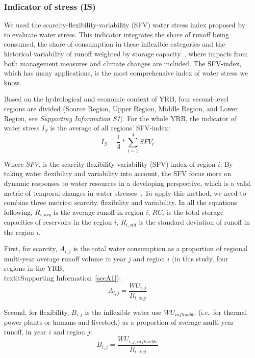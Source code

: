 	\subsubsection{Indicator of stress (IS)}
	We used the scarcity-flexibility-variability (SFV) water stress index proposed by  to evaluate water stress.
	This indicator integrates the share of runoff being consumed, the share of consumption in these inflexible categories and the historical variability of runoff weighted by storage capacity~\cite{qin2019}, where impacts from both management measures and climate changes are included.
	The SFV-index, which has many applications, is the most comprehensive index of water stress we know. %

	Based on the hydrological and economic context of YRB, four second-level regions are divided (Source Region, Upper Region, Middle Region, and Lower Region, see \textit{Supporting Information S1}).
	For the whole YRB, the indicator of water stress $I_S$ is the average of all regions' SFV-index:
	\begin{equation}
		I_S = \frac{1}{4} * \sum_{i=1}^4 SFV_{i}
	\end{equation}

	Where $SFV_i$ is the scarcity-flexibility-variability (SFV) index of region $i$. By taking water flexibility and variability into account, the SFV focus more on dynamic responses to water resources in a developing perspective, which is a valid metric of temporal changes in water stresses~\cite{qin2019}. To apply this method, we need to combine three metrics: scarcity, flexibility and variability.
	In all the equations following, $R_{i, avg}$ is the average runoff in region $i$, $RC_i$ is the total storage capacities of reservoirs in the region $i$, $R_{i, std}$ is the standard deviation of runoff in the region $i$.

	First, for scarcity, $A_{i, j}$ is the total water consumption as a proportion of regional multi-year average runoff volume in year $j$ and region $i$ (in this study, four regions in the YRB, \\textit{Supporting Information}~\ref{secA1}):
	\begin{equation}
		A_{i, j} = \frac{WU_{i,j}}{R_{i, avg}}
	\end{equation}

	Second, for flexibility, $B_{i, j}$ is the inflexible water use $WU_{inflexible}$ (i.e.\ for thermal power plants or humans and livestock) as a proportion of average multi-year runoff, in year $i$ and region $j$:
	\begin{equation}
		B_{i, j} = \frac{WU_{i, j, inflexible}}{R_{i, avg}}
	\end{equation}

